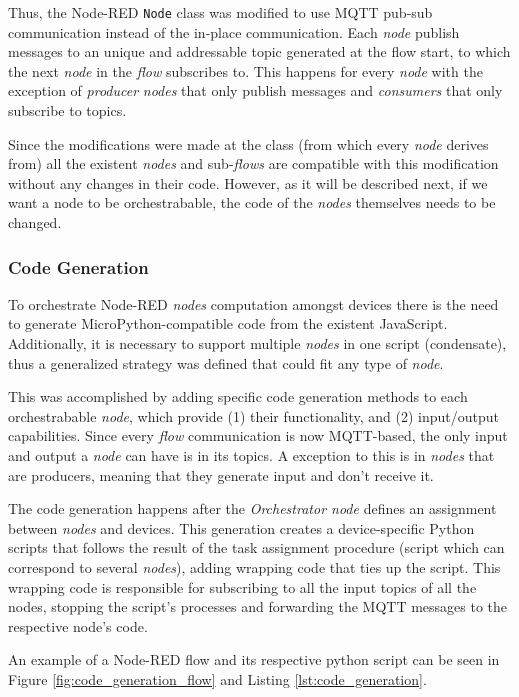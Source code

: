Thus, the Node-RED \texttt{Node} class was modified to use MQTT pub-sub communication instead of the in-place communication. Each \textit{node} publish messages to an unique and addressable topic generated at the flow start, to which the next \textit{node} in the \textit{flow} subscribes to. This happens for every \textit{node} with the exception of \textit{producer} \textit{nodes} that only publish messages and \textit{consumers} that only subscribe to topics.

Since the modifications were made at the class (from which every \textit{node} derives from) all the existent \textit{nodes} and sub-\textit{flows} are compatible with this modification without any changes in their code. However, as it will be described next, if we want a node to be orchestrabable, the code of the \textit{nodes} themselves needs to be changed.

\subsubsection{Code Generation}\label{sec:code_generation}

To orchestrate Node-RED \textit{nodes} computation amongst devices there is the need to generate MicroPython-compatible code from the existent JavaScript. Additionally, it is necessary to support multiple \textit{nodes} in one script (\ie condensate), thus a generalized strategy was defined that could fit any type of \textit{node}.

This was accomplished by adding specific code generation methods to each orchestrabable \textit{node}, which provide (1) their functionality, and (2) input/output capabilities. Since every \textit{flow} communication is now MQTT-based, the only input and output a \textit{node} can have is in its topics. A exception to this is in \textit{nodes} that are producers, meaning that they generate input and don't receive it. 

The code generation happens after the \textit{Orchestrator node} defines an assignment between \textit{nodes} and devices. This generation creates a device-specific Python scripts that follows the result of the task assignment procedure (script which can correspond to several \textit{nodes}), adding wrapping code that ties up the script. This wrapping code is responsible for subscribing to all the input topics of all the nodes, stopping the script's processes and forwarding the MQTT messages to the respective node's code.

An example of a Node-RED flow and its respective python script can be seen in Figure \ref{fig:code_generation_flow} and Listing \ref{lst:code_generation}.

